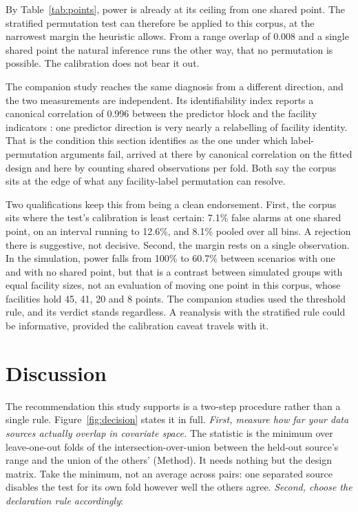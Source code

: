 \documentclass[journal=dce]{CUP-JNL-DTM}%
\begin{document}
By Table~\ref{tab:points}, power is already at its ceiling from one shared point. The stratified permutation test can therefore be applied to this corpus, at the narrowest margin the heuristic allows. From a range overlap of 0.008 and a single shared point the natural inference runs the other way, that no permutation is possible. The calibration does not bear it out.

The companion study reaches the same diagnosis from a different direction, and the two measurements are independent. Its identifiability index reports a canonical correlation of 0.996 between the predictor block and the facility indicators \citep{gilruiz2026paper2}: one predictor direction is very nearly a relabelling of facility identity. That is the condition this section identifies as the one under which label-permutation arguments fail, arrived at there by canonical correlation on the fitted design and here by counting shared observations per fold. Both say the corpus sits at the edge of what any facility-label permutation can resolve.

Two qualifications keep this from being a clean endorsement. First, the corpus sits where the test's calibration is least certain: 7.1\% false alarms at one shared point, on an interval running to 12.6\%, and 8.1\% pooled over all bins. A rejection there is suggestive, not decisive. Second, the margin rests on a single observation. In the simulation, power falls from 100\% to 60.7\% between scenarios with one and with no shared point, but that is a contrast between simulated groups with equal facility sizes, not an evaluation of moving one point in this corpus, whose facilities hold 45, 41, 20 and 8 points. The companion studies used the threshold rule, and its verdict stands regardless. A reanalysis with the stratified rule could be informative, provided the calibration caveat travels with it.


\section{Discussion}

The recommendation this study supports is a two-step procedure rather than a single rule. Figure~\ref{fig:decision} states it in full. \emph{First, measure how far your data sources actually overlap in covariate space.} The statistic is the minimum over leave-one-out folds of the intersection-over-union between the held-out source's range and the union of the others' (Method). It needs nothing but the design matrix. Take the minimum, not an average across pairs: one separated source disables the test for its own fold however well the others agree. \emph{Second, choose the declaration rule accordingly}:
\end{document}

